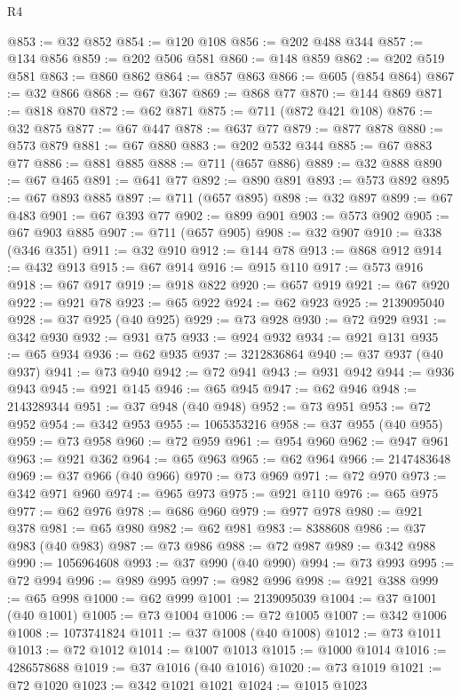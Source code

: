 \begin{lexlean}{R4}
\begin{coremodule}
@853 := @32 @852
@854 := @120 @108
@856 := @202 @488 @344
@857 := @134 @856
@859 := @202 @506 @581
@860 := @148 @859
@862 := @202 @519 @581
@863 := @860 @862
@864 := @857 @863
@866 := @605 (@854 @864)
@867 := @32 @866
@868 := @67 @367
@869 := @868 @77
@870 := @144 @869
@871 := @818 @870
@872 := @62 @871
@875 := @711 (@872 @421 @108)
@876 := @32 @875
@877 := @67 @447
@878 := @637 @77
@879 := @877 @878
@880 := @573 @879
@881 := @67 @880
@883 := @202 @532 @344
@885 := @67 @883 @77
@886 := @881 @885
@888 := @711 (@657 @886)
@889 := @32 @888
@890 := @67 @465
@891 := @641 @77
@892 := @890 @891
@893 := @573 @892
@895 := @67 @893 @885
@897 := @711 (@657 @895)
@898 := @32 @897
@899 := @67 @483
@901 := @67 @393 @77
@902 := @899 @901
@903 := @573 @902
@905 := @67 @903 @885
@907 := @711 (@657 @905)
@908 := @32 @907
@910 := @338 (@346 @351)
@911 := @32 @910
@912 := @144 @78
@913 := @868 @912
@914 := @432 @913
@915 := @67 @914
@916 := @915 @110
@917 := @573 @916
@918 := @67 @917
@919 := @918 @822
@920 := @657 @919
@921 := @67 @920
@922 := @921 @78
@923 := @65 @922
@924 := @62 @923
@925 := 2139095040
@928 := @37 @925 (@40 @925)
@929 := @73 @928
@930 := @72 @929
@931 := @342 @930
@932 := @931 @75
@933 := @924 @932
@934 := @921 @131
@935 := @65 @934
@936 := @62 @935
@937 := 3212836864
@940 := @37 @937 (@40 @937)
@941 := @73 @940
@942 := @72 @941
@943 := @931 @942
@944 := @936 @943
@945 := @921 @145
@946 := @65 @945
@947 := @62 @946
@948 := 2143289344
@951 := @37 @948 (@40 @948)
@952 := @73 @951
@953 := @72 @952
@954 := @342 @953
@955 := 1065353216
@958 := @37 @955 (@40 @955)
@959 := @73 @958
@960 := @72 @959
@961 := @954 @960
@962 := @947 @961
@963 := @921 @362
@964 := @65 @963
@965 := @62 @964
@966 := 2147483648
@969 := @37 @966 (@40 @966)
@970 := @73 @969
@971 := @72 @970
@973 := @342 @971 @960
@974 := @965 @973
@975 := @921 @110
@976 := @65 @975
@977 := @62 @976
@978 := @686 @960
@979 := @977 @978
@980 := @921 @378
@981 := @65 @980
@982 := @62 @981
@983 := 8388608
@986 := @37 @983 (@40 @983)
@987 := @73 @986
@988 := @72 @987
@989 := @342 @988
@990 := 1056964608
@993 := @37 @990 (@40 @990)
@994 := @73 @993
@995 := @72 @994
@996 := @989 @995
@997 := @982 @996
@998 := @921 @388
@999 := @65 @998
@1000 := @62 @999
@1001 := 2139095039
@1004 := @37 @1001 (@40 @1001)
@1005 := @73 @1004
@1006 := @72 @1005
@1007 := @342 @1006
@1008 := 1073741824
@1011 := @37 @1008 (@40 @1008)
@1012 := @73 @1011
@1013 := @72 @1012
@1014 := @1007 @1013
@1015 := @1000 @1014
@1016 := 4286578688
@1019 := @37 @1016 (@40 @1016)
@1020 := @73 @1019
@1021 := @72 @1020
@1023 := @342 @1021 @1021
@1024 := @1015 @1023

\end{coremodule}
\end{lexlean}
